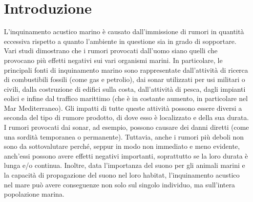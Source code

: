 
\chapter*{Introduzione}

L’inquinamento acustico marino è causato dall’immissione di rumori in quantità eccessiva rispetto a quanto l’ambiente in questione sia in grado di sopportare. Vari studi dimostrano che i rumori provocati dall’uomo siano quelli che provocano più effetti negativi sui vari organismi marini. In particolare, le principali fonti di inquinamento marino sono rappresentate dall’attività di ricerca di combustibili fossili (come gas e petrolio), dai sonar utilizzati per usi militari o civili, dalla costruzione di edifici sulla costa, dall’attività di pesca, dagli impianti eolici e infine dal traffico marittimo (che è in costante aumento, in particolare nel Mar Mediterraneo).
Gli impatti di tutte queste attività possono essere diversi a seconda del tipo di rumore prodotto, di dove esso è localizzato e della sua durata. I rumori provocati dai sonar, ad esempio, possono causare dei danni diretti (come una sordità temporanea o permanente). Tuttavia, anche i rumori più deboli non sono da sottovalutare perché, seppur in modo non immediato e meno evidente, anch’essi possono avere effetti negativi importanti, soprattutto se la loro durata è lunga e/o continua. Inoltre, data l’importanza del suono per gli animali marini e la capacità di propagazione del suono nel loro habitat, l’inquinamento acustico nel mare può avere conseguenze non solo sul singolo individuo, ma sull’intera popolazione marina.



